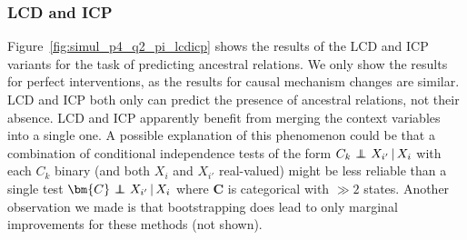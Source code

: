 \documentclass[twoside,11pt]{article}
\DeclareMathOperator*{\CI}{{\,\perp\mkern-12mu\perp\,}}
\newcommand\B[1]{\bm{#1}}
\newcommand\given{\,|\,}
\begin{document}
\begin{comment}
\caption{Results of FCI variants (acyclic, causal mechanism changes).\label{fig:simul_p4_q2_acyclic_mc_FCI}}
\end{figure}
\begin{figure}
\centerline{%
\texttt{[image: \{linear\_stochastic\_4\_2\_0.5\_0.5\_500\_0\_0\_ROC\_sys2sys\_arel\_fci]}.png}
\texttt{[image: \{linear\_stochastic\_4\_2\_0.5\_0.5\_500\_0\_0\_PR1\_sys2sys\_arel\_fci]}.png}
\texttt{[image: \{linear\_stochastic\_4\_2\_0.5\_0.5\_500\_0\_0\_PR0\_sys2sys\_arel\_fci]}.png}
\texttt{[image: \{linear\_stochastic\_4\_2\_0.5\_0.5\_500\_0\_0\_LEG\_sys2sys\_arel\_fci]}.png}
}
\caption{Results of FCI variants (cyclic, causal mechanism changes).\label{fig:simul_p4_q2_cyclic_mc_FCI}}
\end{figure}
\end{comment}


\subsubsection{LCD and ICP}

Figure~\ref{fig:simul_p4_q2_pi_lcdicp} shows the results of the LCD and ICP variants for the task of predicting ancestral relations.
We only show the results for perfect interventions, as the results for causal
mechanism changes are similar. LCD and ICP both only can predict 
the presence of ancestral relations, not their absence. LCD and ICP apparently benefit from merging the context variables into a single one.
A possible explanation of this phenomenon could be that a combination of conditional 
independence tests of the form $C_k \CI X_{i'} \given X_i$ with each $C_k$ binary (and both $X_i$ and 
$X_{i'}$ real-valued) might be less reliable than a single test $\B{C} \CI X_{i'} \given X_i$ where 
$\B{C}$ is categorical with $\gg 2$ states.
Another observation we made is that bootstrapping does lead to only marginal improvements for these methods (not shown).
\end{document}
